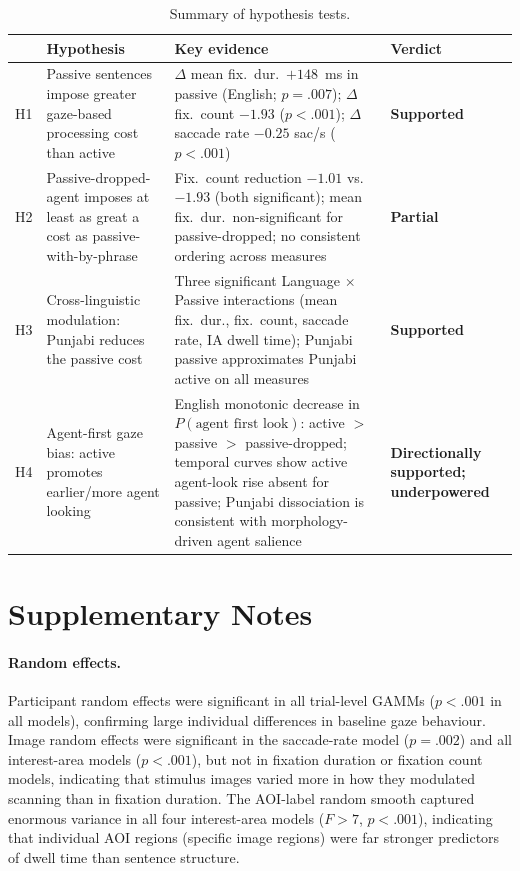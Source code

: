 \documentclass[12pt, a4paper]{article}
\begin{document}
\begin{table}[h]
\centering
\caption{Summary of hypothesis tests.}
\label{tab:hypotheses}
\begin{threeparttable}
\begin{tabular}{p{0.5cm} p{5.5cm} p{5cm} p{2cm}}
\toprule
 & Hypothesis & Key evidence & Verdict \\
\midrule
H1 & Passive sentences impose greater gaze-based processing cost than active &
  $\Delta$ mean fix.\ dur.\ $+148$~ms in passive (English; $p=.007$);
  $\Delta$ fix.\ count $-1.93$ ($p<.001$);
  $\Delta$ saccade rate $-0.25$ sac/s ($p<.001$) &
  \textbf{Supported} \\[6pt]
H2 & Passive-dropped-agent imposes at least as great a cost as passive-with-by-phrase &
  Fix.\ count reduction $-1.01$ vs.\ $-1.93$ (both significant);
  mean fix.\ dur.\ non-significant for passive-dropped;
  no consistent ordering across measures &
  \textbf{Partial} \\[6pt]
H3 & Cross-linguistic modulation: Punjabi reduces the passive cost &
  Three significant Language $\times$ Passive interactions
  (mean fix.\ dur., fix.\ count, saccade rate, IA dwell time);
  Punjabi passive approximates Punjabi active on all measures &
  \textbf{Supported} \\[6pt]
H4 & Agent-first gaze bias: active promotes earlier/more agent looking &
  English monotonic decrease in $P(\text{agent first look})$: active $>$ passive $>$ passive-dropped;
  temporal curves show active agent-look rise absent for passive;
  Punjabi dissociation is consistent with morphology-driven agent salience &
  \textbf{Directionally supported; underpowered} \\
\bottomrule
\end{tabular}
\end{threeparttable}
\end{table}

\section*{Supplementary Notes}

\paragraph{Random effects.}
Participant random effects were significant in all trial-level GAMMs
($p < .001$ in all models), confirming large individual differences in
baseline gaze behaviour.
Image random effects were significant in the saccade-rate model
($p = .002$) and all interest-area models ($p < .001$), but not in
fixation duration or fixation count models, indicating that stimulus
images varied more in how they modulated scanning than in fixation duration.
The AOI-label random smooth captured enormous variance in all four
interest-area models ($F > 7$, $p < .001$), indicating that individual
AOI regions (specific image regions) were far stronger predictors of
dwell time than sentence structure.
\end{document}
